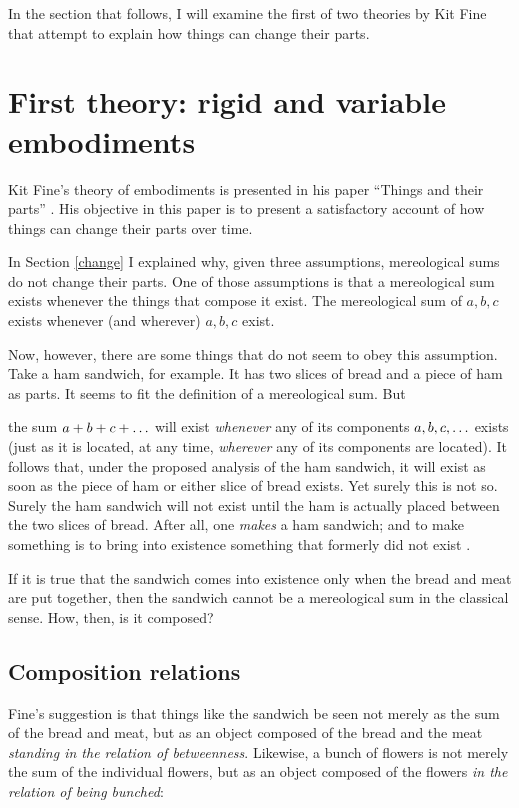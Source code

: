 \documentclass[12pt,twoside]{reedfancy}
\newenvironment{squote}{%
	\begin{spacing}{1}
	\begin{list}{}{%
	\setlength{\labelwidth}{0pt}%
	\rightmargin\leftmargin%
	}
	\item\relax
	}{%
	\end{list}%
	\end{spacing}
	}
\begin{document}
\begin{spacing}{1.25}
In the section that follows, I will examine the first of two theories
by Kit Fine that attempt to explain how things can change their parts.

\section{First theory: rigid and variable embodiments}
\label{fine-h}
Kit Fine's theory of embodiments is presented in his paper ``Things
and their parts'' \citeyearpar{fine1999}.  His objective in this paper
is to present a satisfactory account of how things can change their
parts over time.

In Section \ref{change} I explained why, given three assumptions,
mereological sums do not change their parts.  One of those assumptions
is that a mereological sum exists whenever the things that compose it
exist.  The mereological sum of $a, b, c$ exists whenever (and
wherever) $a, b, c$ exist.

Now, however, there are some things that do not seem to obey this
assumption.  Take a ham sandwich, for example.  It has two slices of
bread and a piece of ham as parts.  It seems to fit the definition of
a mereological sum.  But

\begin{squote}
the sum $a + b + c + \mathellipsis $ will exist {\em whenever} any of
its components $a, b, c, \mathellipsis $ exists (just as it is
located, at any time, {\em wherever} any of its components are
located).  It follows that, under the proposed analysis of the ham
sandwich, it will exist as soon as the piece of ham or either slice of
bread exists.  Yet surely this is not so.  Surely the ham sandwich
will not exist until the ham is actually placed between the two slices
of bread.  After all, one {\em makes} a ham sandwich; and to make
something is to bring into existence something that formerly did not
exist \citep[62]{fine1999}.
\end{squote}

If it is true that the sandwich comes into existence only when the
bread and meat are put together, then the sandwich cannot be a
mereological sum in the classical sense.  How, then, is it composed?

\subsection{Composition relations}
\label{rigid}
Fine's suggestion is that things like the sandwich be seen not merely
as the sum of the bread and meat, but as an object composed of the
bread and the meat {\em standing in the relation of betweenness}.
Likewise, a bunch of flowers is not merely the sum of the individual
flowers, but as an object composed of the flowers {\em in the relation
  of being bunched}:


\end{spacing}
\end{document}
